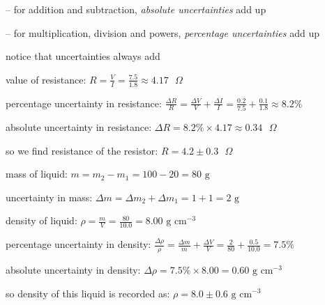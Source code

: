 \begin{ilight}
	-- for addition and subtraction, \emph{absolute uncertainties} add up
	
	-- for multiplication, division and powers, \emph{percentage uncertainties} add up
	
\end{ilight}

\cmt notice that uncertainties always add


\newpage


value of resistance: $R=\frac{V}{I} = \frac{7.5}{1.8} \approx 4.17  \text{ }\Omega$

percentage uncertainty in resistance: $\frac{\Delta R}{R} = \frac{\Delta V}{V} + \frac{\Delta I}{I} = \frac{0.2}{7.5} + \frac{0.1}{1.8} \approx 8.2 \%$

absolute uncertainty in resistance: $\Delta R = 8.2\% \times 4.17 \approx 0.34 \text{ }\Omega$

so we find resistance of the resistor: $R = 4.2 \pm 0.3  \text{ }\Omega$ \eoe


\sol mass of liquid: $m = m_2 - m_1 = 100 -20 = 80 \text{ g}$

uncertainty in mass: $\Delta m = \Delta m_2 + \Delta m_1 = 1 + 1 = 2 \text{ g}$

density of liquid: $\rho = \frac{m}{V} = \frac{80}{10.0} = 8.00 \text{ g cm}^{-3}$

percentage uncertainty in density: $\frac{\Delta \rho}{\rho} = \frac{\Delta m}{m} + \frac{\Delta V}{V} = \frac{2}{80} + \frac{0.5}{10.0} = 7.5 \%$

absolute uncertainty in density: $\Delta \rho = 7.5\% \times 8.00 = 0.60 \text{ g cm}^{-3}$

so density of this liquid is recorded as: $\rho = 8.0 \pm 0.6 \text{ g cm}^{-3}$ \eoe


